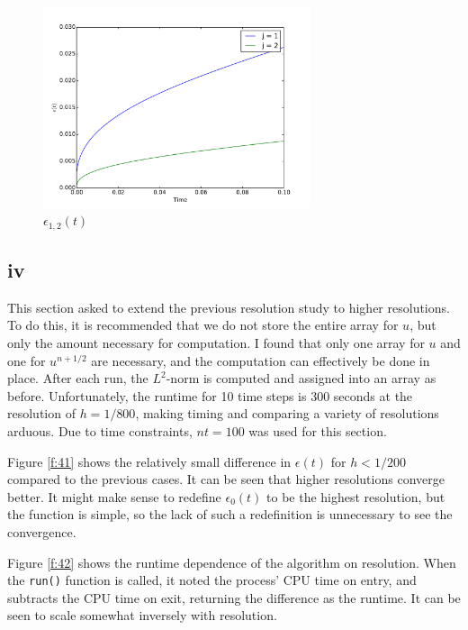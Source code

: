 \documentclass{article}
\begin{document}
\begin{figure}
  \centering
  \includegraphics[width=0.7\textwidth]{2/3/plot.pdf}
  \caption{$\epsilon_{1,2}(t)$}
  \label{f:3}
\end{figure}

\subsection*{iv}
This section asked to extend the previous resolution study to higher resolutions. To do this, it is recommended
that we do not store the entire array for $u$, but only the amount necessary for computation.
I found that only one array for $u$ and one for $u^{n+1/2}$ are necessary, and the computation
can effectively be done in place. After each run, the $L^2$-norm is computed and assigned into an array
as before. Unfortunately, the runtime for 10 time steps is 300 seconds at the resolution of $h = 1/800$,
making timing and comparing a variety of resolutions arduous. Due to time constraints, $nt=100$ was used
for this section.

Figure \ref{f:41} shows the relatively small difference in $\epsilon(t)$ for $h < 1/200$ compared to the previous
cases. It can be seen that higher resolutions converge better. It might make sense to redefine $\epsilon_0(t)$ to be
the highest resolution, but the function is simple, so the lack of such a redefinition is unnecessary to see
the convergence.

Figure \ref{f:42} shows the runtime dependence of the algorithm on resolution. When the \verb+run()+ function is
called, it noted the process' CPU time on entry, and subtracts the CPU time on exit, returning the difference as
the runtime.
It can be seen to scale somewhat inversely with resolution.
\end{document}
